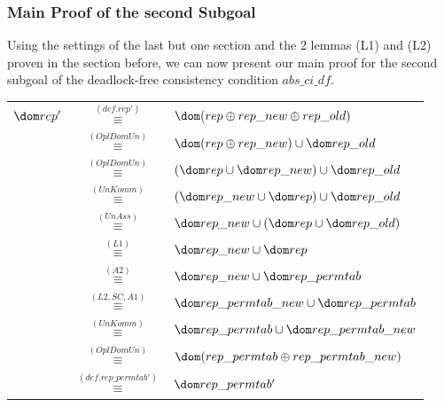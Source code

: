 \subsubsection{Main Proof of the second Subgoal}
%    
%   
Using the settings of the last but one section and the 2 lemmas (L1)
and (L2) proven in the section before, we can now present our main
proof for the second subgoal of the deadlock-free consistency
condition $abs\_ci\_df$.
\begin{center}
\begin{tabular}{rcl}
$\dom rep'$ &$\stackrel{(def. rep')}{\equiv}$&$  \dom (rep \oplus rep\_new \oplus rep\_old)$\\%
&$\stackrel{(OplDomUn)}{\equiv}$&$ \dom (rep \oplus rep\_new) \cup \dom rep\_old  $\\ %
&$\stackrel{(OplDomUn)}{\equiv}$&$ (\dom rep \cup \dom rep\_new) \cup \dom rep\_old$\\%
&$\stackrel{(UnKomm)}{\equiv}$&$ (\dom rep\_new \cup \dom rep) \cup \dom rep\_old$\\%
&$\stackrel{(UnAss)}{\equiv}$&$ \dom rep\_new \cup (\dom rep \cup \dom rep\_old)$\\%
&$\stackrel{(L1)}{\equiv}$&$ \dom rep\_new \cup \dom rep$\\%
&$\stackrel{(A2)}{\equiv}$&$ \dom rep\_new \cup \dom rep\_permtab$\\%
&$\stackrel{(L2,SC,A1)}{\equiv}$&$ \dom rep\_permtab\_new \cup \dom rep\_permtab$\\%
&$\stackrel{(UnKomm)}{\equiv}$&$ \dom rep\_permtab \cup \dom rep\_permtab\_new$\\%
&$\stackrel{(OplDomUn)}{\equiv}$&$ \dom (rep\_permtab \oplus rep\_permtab\_new)$\\%
&$\stackrel{(def.rep\_permtab')}{\equiv}$&$ \dom rep\_permtab'$\\%
\end{tabular}
\end{center}
%
%
%
